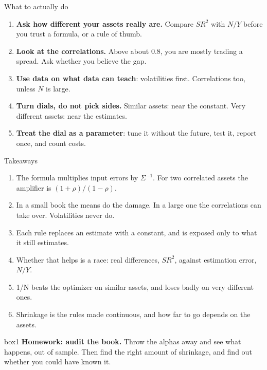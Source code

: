\documentclass[aspectratio=169,10pt]{beamer}
\begin{document}
\begin{frame}{What to actually do}
\vskip 6pt
\begin{enumerate}
\item \textbf{Ask how different your assets really are.} Compare $SR^{2}$ with $N/Y$ before you trust a formula, or a rule of thumb.
\vskip 8pt
\item \textbf{Look at the correlations.} Above about 0.8, you are mostly trading a spread. Ask whether you believe the gap.
\vskip 8pt
\item \textbf{Use data on what data can teach}: volatilities first. Correlations too, unless $N$ is large.
\vskip 8pt
\item \textbf{Turn dials, do not pick sides.} Similar assets: near the constant. Very different assets: near the estimates.
\vskip 8pt
\item \textbf{Treat the dial as a parameter}: tune it without the future, test it, report once, and count costs.
\end{enumerate}
\end{frame}

\begin{frame}{Takeaways}
\begin{enumerate}
\item The formula multiplies input errors by $\Sigma^{-1}$. For two correlated assets the amplifier is $(1+\rho)/(1-\rho)$.
\vskip 4pt
\item In a small book the means do the damage. In a large one the correlations can take over. Volatilities never do.
\vskip 4pt
\item Each rule replaces an estimate with a constant, and is exposed only to what it still estimates.
\vskip 4pt
\item Whether that helps is a race: real differences, $SR^{2}$, against estimation error, $N/Y$.
\vskip 4pt
\item 1/N beats the optimizer on similar assets, and loses badly on very different ones.
\vskip 4pt
\item Shrinkage is the rules made continuous, and how far to go depends on the assets.
\end{enumerate}
\vskip 8pt
\begin{beamercolorbox}[rounded=true,sep=7pt]{box1}
\textbf{Homework: audit the book.} Throw the alphas away and see what happens, out of sample. Then find the right amount of shrinkage, and find out whether you could have known it.
\end{beamercolorbox}
\end{frame}
\end{document}
